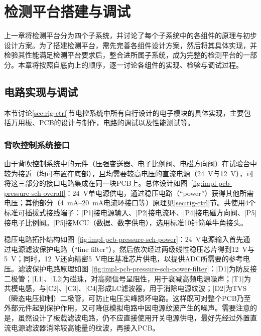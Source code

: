 \chapter{检测平台搭建与调试}\label{ch:impl}

上一章将检测平台分为四个子系统，并讨论了每个子系统中的各组件的原理与初步设计方案。为了搭建检测平台，需先完善各组件设计方案，然后将其具体实现，并检验其性能满足检测平台要求后，整合进所属子系统，成为完整的检测平台的一部分。本章将按照自底向上的顺序，逐一讨论各组件的实现、检验与调试过程。



\section{电路实现与调试}\label{sec:impl-pcb}

本节讨论\ref{sec:rig-ctrl}节电控系统中所有自行设计的电子模块的具体实现，主要包括万用板、PCB的设计与制作，电路的调试以及性能测试等。


\subsection{背吹控制系统接口}\label{sec:impl-pcb-pressure}

由于背吹控制系统中的元件（压强变送器、电子比例阀、电磁方向阀）在试验台中较为接近（均可布置在底部），且均需要较高电压的直流电源（\SI{+24}{\V}与\SI{+12}{\V}），可将这三部分的接口电路集成在同一块PCB上。总体设计如图~\ref{fig:impl-pcb-pressure-sch-overall}：\SI{+24}{\V}单电源供电，通过稳压电路（``power''）获得其他所需电压；其他部分（\SIrange{4}{20}{\mA}电流环接口等）原理见\ref{sec:rig-ctrl}节。共使用4个标准可插拔式接线端子：\bverb|P1|接电源输入、\bverb|P2|接电流环、\bverb|P4|接电磁方向阀、\bverb|P5|接电子比例阀。\bverb|P5|接MCU（数据、数字供电），选用标准10针简单牛角接头。

稳压电路拓扑结构如图~\ref{fig:impl-pcb-pressure-sch-power}：\SI{+24}{\V}电源输入首先通过电源滤波保护电路（``line filter''），然后依次经过两级线性稳压芯片得到\SI{+12}{\V}与\SI{+5}{\V}；同时，\SI{+12}{\V}还向精密\SI{+5}{\V}电压基准芯片供电，以提供ADC所需要的参考电压。滤波保护电路原理如图~\ref{fig:impl-pcb-pressure-sch-power-filter}：\bverb|D1|为防反接二极管；\bverb|L1|、\bverb|L2|为磁珠，对高频信号呈阻性，用于衰减高频电源噪声；\bverb|T1|为共模电感，与\bverb|C2|、\bverb|C3|、\bverb|C4|形成LC滤波器，用于消除电源纹波；\bverb|D2|为TVS（瞬态电压抑制）二极管，可防止电压尖峰损坏电路。这样既可对整个PCB乃至外部元件起到保护作用，又可降低模拟电路中因电源纹波产生的噪声。需要注意的是，虽然设计了板载滤波电路，仍不应直接使用开关电源供电，最好先经过外置直流电源滤波器消除较高能量的纹波，再接入PCB。

